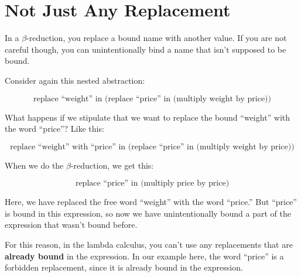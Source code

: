 \documentclass{book}
\numberwithin{equation}{chapter}
\newcommand{\vocab}{\textbf}
\begin{document}
\section{Not Just Any Replacement}

In a $\beta$-reduction, you replace a bound name with another value. If you are not careful though, you can unintentionally bind a name that isn't supposed to be bound. 

Consider again this nested abstraction:

\begin{equation}
\text{replace ``weight'' in (replace ``price'' in (multiply weight by price))}
\end{equation}

\noindent
What happens if we stipulate that we want to replace the bound ``weight'' with the word ``price''? Like this:

\begin{equation}
\text{replace ``weight'' with ``price'' in (replace ``price'' in (multiply weight by price))}
\end{equation}

\noindent
When we do the $\beta$-reduction, we get this:

\begin{equation}
\text{replace ``price'' in (multiply price by price)}
\end{equation}

\noindent
Here, we have replaced the free word ``weight'' with the word ``price.'' But ``price'' is bound in this expression, so now we have unintentionally bound a part of the expression that wasn't bound before.

For this reason, in the lambda calculus, you can't use any replacements that are \vocab{already bound} in the expression. In our example here, the word ``price'' is a forbidden replacement, since it is already bound in the expression.





\end{document}
